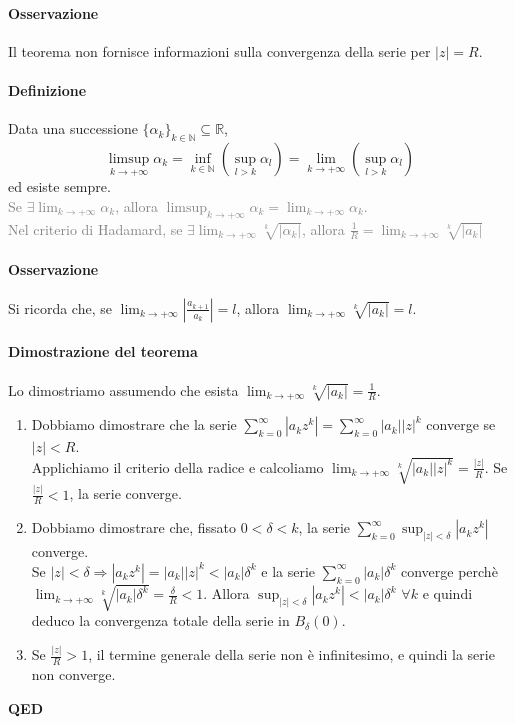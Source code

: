 \documentclass{article}
\newcommand{\R}{\mathbb{R}}
\newcommand{\N}{\mathbb{N}}
\begin{document}
\paragraph{{Osservazione}}
Il teorema non fornisce informazioni sulla convergenza della serie per $|z|=R$.

\paragraph{{Definizione}}
Data una successione $\{\alpha_k\}_{k\in\N}\subseteq \R$, 
\begin{equation*}
    \limsup_{k\rightarrow+\infty} \alpha_k=\inf_{k\in\N}\left(\sup_{l>k} \alpha_l\right)=\lim_{k \rightarrow+\infty}\left(\sup_{l>k}\alpha_l\right)
\end{equation*}
ed esiste sempre.\\
\textcolor{grey}{Se $\exists \lim_{k\rightarrow+\infty}\alpha_k$, allora $\limsup_{k\rightarrow+\infty}\alpha_k=\lim_{k\rightarrow+\infty}\alpha_k$.\\ Nel criterio di Hadamard, se $\exists \lim_{k\rightarrow+\infty}\sqrt[k]{|\alpha_k|}$, allora $\frac{1}{R}=\lim_{k\rightarrow+\infty}\sqrt[k]{|a_k|}$}

\paragraph{{Osservazione}}
Si ricorda che, se $\lim_{k\rightarrow+\infty}|\frac{a_{k+1}}{a_k}|=l$, allora $\lim_{k\rightarrow+\infty}\sqrt[k]{|a_k|}=l$.

\paragraph{{Dimostrazione del teorema}}
Lo dimostriamo assumendo che esista $\lim_{k\rightarrow+\infty}\sqrt[k]{|a_k|}=\frac{1}{R}$.
\begin{enumerate}
    \item Dobbiamo dimostrare che la serie $\sum_{k=0}^{\infty}|a_kz^k|=\sum_{k=0}^{\infty}|a_k||z|^k$ converge se $|z|<R$.\\ Applichiamo il criterio della radice e calcoliamo $\lim_{k \rightarrow+\infty}\sqrt[k]{|a_k||z|^k}=\frac{|z|}{R}$. Se $\frac{|z|}{R}<1$, la serie converge.
    \item Dobbiamo dimostrare che, fissato $0<\delta<k$, la serie $\sum_{k=0}^{\infty}\sup_{|z|<\delta} |a_kz^k|$ converge.\\ Se $|z|<\delta \Rightarrow |a_kz^k|=|a_k||z|^k<|a_k|\delta^k$ e la serie $\sum_{k=0}^{\infty}|a_k|\delta^k$ converge perchè $\lim_{k \rightarrow+\infty} \sqrt[k]{|a_k|\delta^k}=\frac{\delta}{R}<1$. Allora $\sup_{|z|<\delta}|a_kz^k|<|a_k|\delta^k\,\, \forall k$ e quindi deduco la convergenza totale della serie in $B_{\delta}(0)$.
    \item Se $\frac{|z|}{R}>1$, il termine generale della serie non è infinitesimo, e quindi la serie non converge.
\end{enumerate}
\begin{flushright}
\textbf{QED}
\end{flushright}
\end{document}
